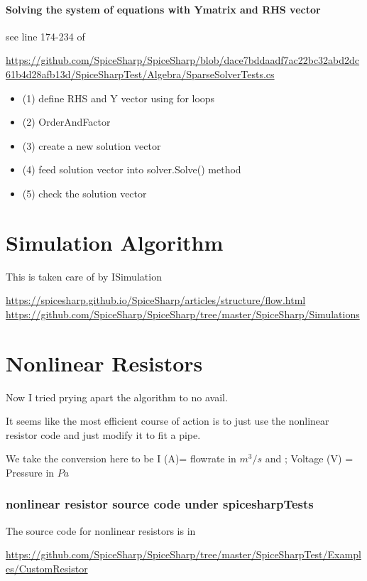 \documentclass[12pt]{article}
\renewcommand{\_}{\kern-1.5pt\textunderscore\kern-1.5pt}
\begin{document}
\subsection{Solving the system of equations with Ymatrix and RHS vector}

see line 174-234 of


\url{https://github.com/SpiceSharp/SpiceSharp/blob/dace7bddaadf7ac22bc32abd2dc61b4d28afb13d/SpiceSharpTest/Algebra/SparseSolverTests.cs}

\begin{itemize}
\item (1) define RHS and Y vector using for loops
\item (2) OrderAndFactor
\item (3) create a new solution vector
\item (4) feed solution vector into solver.Solve() method
\item (5) check the solution vector
\end{itemize}



\part{Simulation Algorithm}

This is taken care of by ISimulation

\url{https://spicesharp.github.io/SpiceSharp/articles/structure/flow.html}
\url{https://github.com/SpiceSharp/SpiceSharp/tree/master/SpiceSharp/Simulations}


\part{Nonlinear Resistors}
Now I tried prying apart the algorithm to no avail.

It seems like the most efficient course of action is to just use the nonlinear
resistor code and just modify it to fit a pipe. 

We take the conversion here to be I (A)= flowrate in $m^3/s$ 
and ; Voltage (V) = Pressure in $Pa$

\section[]{nonlinear resistor source code under spicesharpTests}
The source code for nonlinear resistors is in 

\url{https://github.com/SpiceSharp/SpiceSharp/tree/master/SpiceSharpTest/Examples/CustomResistor}
\end{document}
